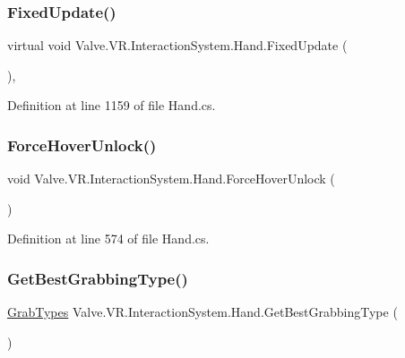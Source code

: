 \subsubsection{\texorpdfstring{FixedUpdate()}{FixedUpdate()}}
{\footnotesize\ttfamily virtual void Valve.\+V\+R.\+Interaction\+System.\+Hand.\+Fixed\+Update (\begin{DoxyParamCaption}{ }\end{DoxyParamCaption})\hspace{0.3cm}{\ttfamily [protected]}, {\ttfamily [virtual]}}



Definition at line 1159 of file Hand.\+cs.

\mbox{\label{class_valve_1_1_v_r_1_1_interaction_system_1_1_hand_a93b111e767435715745cb1dda7817b0c}} 
\subsubsection{\texorpdfstring{ForceHoverUnlock()}{ForceHoverUnlock()}}
{\footnotesize\ttfamily void Valve.\+V\+R.\+Interaction\+System.\+Hand.\+Force\+Hover\+Unlock (\begin{DoxyParamCaption}{ }\end{DoxyParamCaption})}



Definition at line 574 of file Hand.\+cs.

\mbox{\label{class_valve_1_1_v_r_1_1_interaction_system_1_1_hand_aef5b383b995bb0674bf3e53eaadd76e6}} 
\subsubsection{\texorpdfstring{GetBestGrabbingType()}{GetBestGrabbingType()}\hspace{0.1cm}{\footnotesize\ttfamily [1/2]}}
{\footnotesize\ttfamily \mbox{\hyperlink{namespace_valve_1_1_v_r_1_1_interaction_system_ae03ab84d315f5997fd000817bfb96a0f}{Grab\+Types}} Valve.\+V\+R.\+Interaction\+System.\+Hand.\+Get\+Best\+Grabbing\+Type (\begin{DoxyParamCaption}{ }\end{DoxyParamCaption})}



